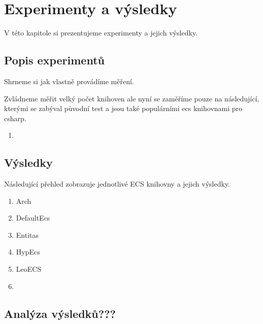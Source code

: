\chapter{Experimenty a výsledky}
V této kapitole si prezentujeme experimenty a jejich výsledky.

\section{Popis experimentů}
Shrneme si jak vlastně provádíme měření.

Zvládneme měřit velký počet knihoven ale nyní se zaměříme pouze na následující, kterými se zabýval původní test a jsou také populárními ecs knihovnami pro csharp.

\begin{enumerate}
    \item 
\end{enumerate}

\section{Výsledky}
Následující přehled zobrazuje jednotlivé ECS knihovny a jejich výsledky.

\begin{enumerate}
    \item Arch~\cite{Arch}
    \item DefaultEcs~\cite{DefaultEcs}
    \item Entitas~\cite{Entitas}
    \item HypEcs~\cite{HypEcs}
    \item LeoECS~\cite{LeoECS}
    \item {}
\end{enumerate}

\section{Analýza výsledků???}





